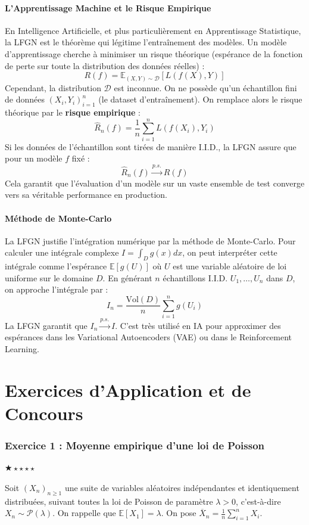 \documentclass[11pt,a4paper]{article}
\begin{document}
\subsection{L'Apprentissage Machine et le Risque Empirique}
En Intelligence Artificielle, et plus particulièrement en Apprentissage Statistique, la LFGN est le théorème qui légitime l'entraînement des modèles.
Un modèle d'apprentissage cherche à minimiser un risque théorique (espérance de la fonction de perte sur toute la distribution des données réelles) :
$$ R(f) = \mathbb{E}_{(X,Y)\sim \mathcal{D}} [ L(f(X), Y) ] $$
Cependant, la distribution $\mathcal{D}$ est inconnue. On ne possède qu'un échantillon fini de données $(X_i, Y_i)_{i=1}^n$ (le dataset d'entraînement).
On remplace alors le risque théorique par le \textbf{risque empirique} :
$$ \widehat{R}_n(f) = \frac{1}{n} \sum_{i=1}^n L(f(X_i), Y_i) $$
Si les données de l'échantillon sont tirées de manière I.I.D., la LFGN assure que pour un modèle $f$ fixé :
$$ \widehat{R}_n(f) \xrightarrow{p.s.} R(f) $$
Cela garantit que l'évaluation d'un modèle sur un vaste ensemble de test converge vers sa véritable performance en production.

\subsection{Méthode de Monte-Carlo}
La LFGN justifie l'intégration numérique par la méthode de Monte-Carlo.
Pour calculer une intégrale complexe $I = \int_D g(x) dx$, on peut interpréter cette intégrale comme l'espérance $\mathbb{E}[g(U)]$ où $U$ est une variable aléatoire de loi uniforme sur le domaine $D$.
En générant $n$ échantillons I.I.D. $U_1, \dots, U_n$ dans $D$, on approche l'intégrale par :
$$ I_n = \frac{\text{Vol}(D)}{n} \sum_{i=1}^n g(U_i) $$
La LFGN garantit que $I_n \xrightarrow{p.s.} I$. C'est très utilisé en IA pour approximer des espérances dans les Variational Autoencoders (VAE) ou dans le Reinforcement Learning.


\newpage
\part{Exercices d'Application et de Concours}
\section*{Exercice 1 : Moyenne empirique d'une loi de Poisson}

$\bigstar\star\star\star\star$

Soit $(X_n)_{n \geq 1}$ une suite de variables aléatoires indépendantes et identiquement distribuées, suivant toutes la loi de Poisson de paramètre $\lambda > 0$, c'est-à-dire $X_n \sim \mathcal{P}(\lambda)$.
On rappelle que $\mathbb{E}[X_1] = \lambda$.
On pose $\overline{X}_n = \frac{1}{n} \sum_{i=1}^n X_i$.
\end{document}
